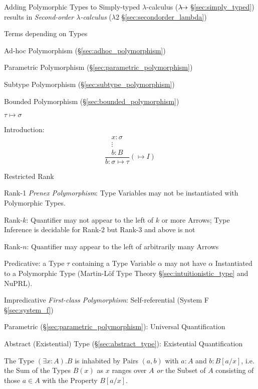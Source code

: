 Adding Polymorphic Types to Simply-typed $\lambda$-calculus
($\lambda\kern-5pt\rightarrow$ \S\ref{sec:simply_typed}) results in
\emph{Second-order $\lambda$-calculus} ($\lambda2$
\S\ref{sec:secondorder_lambda})

Terms depending on Types


Ad-hoc Polymorphism (\S\ref{sec:adhoc_polymorphism})

Parametric Polymorphism (\S\ref{sec:parametric_polymorphism})

Subtype Polymorphism (\S\ref{sec:subtype_polymorphism})

Bounded Polymorphism (\S\ref{sec:bounded_polymorphism})


\asterism


$\tau \mapsto \sigma$

Introduction:
\[
  {
  \frac{
    \begin{matrix}
      x : \sigma \\
      \vdots \\
      b : B
    \end{matrix}
  }
  {b : \sigma \mapsto \tau}
  }(\mapsto I)
\]


\asterism


Restricted Rank

Rank-1 \emph{Prenex Polymorphism}: Type Variables may not be
instantiated with Polymorphic Types.

Rank-$k$: Quantifier may not appear to the left of $k$ or more Arrows;
Type Inference is decidable for Rank-2 but Rank-3 and above is not

Rank-$n$: Quantifier may appear to the left of arbitrarily many Arrows

Predicative: a Type $\tau$ containing a Type Variable $\alpha$ may not
have $\alpha$ Instantiated to a Polymorphic Type (Martin-L\"of Type
Theory \S\ref{sec:intuitionistic_type} and NuPRL).

Impredicative \emph{First-class Polymorphism}: Self-referential
(System F \S\ref{sec:system_f})

Parametric (\S\ref{sec:parametric_polymorphism}): Universal
Quantification

Abstract (Existential) Type (\S\ref{sec:abstract_type}): Existential
Quantification

The Type $(\exists x : A).B$ is inhabited by Pairs $(a,b)$ with $a:A$
and $b:B[a/x]$, i.e. the Sum of the Types $B(x)$ as $x$ ranges over
$A$ \emph{or} the Subset of $A$ consisting of those $a \in A$ with the
Property $B[a/x]$.

